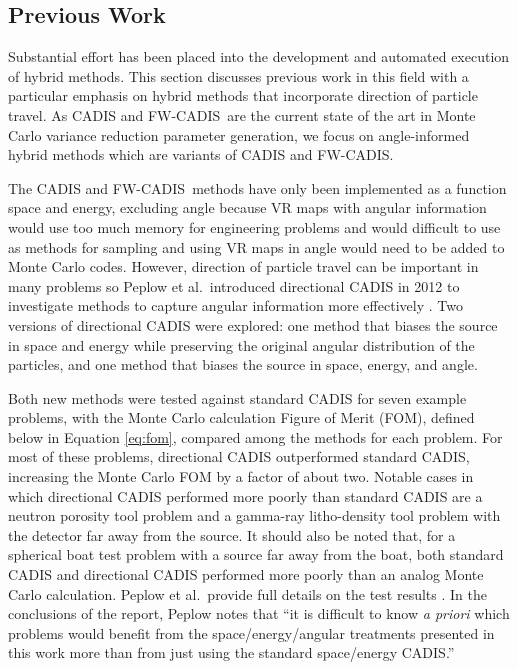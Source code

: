 \documentclass{article} %
\newcommand{\fwc}{\mbox{FW-CADIS}}
\begin{document}
\subsection{Previous Work}

Substantial effort has been placed into the development and automated
execution of hybrid methods. This section discusses previous work in this
field with a particular emphasis on hybrid methods that incorporate
direction of particle travel. As CADIS and \fwc\ are the current state of the
art in Monte Carlo variance reduction parameter generation, we focus on
angle-informed hybrid methods which are variants of CADIS and \fwc.

The CADIS and \fwc\ methods have only been implemented as a
function space and energy, excluding angle because VR maps with angular information would use too much memory for engineering problems and would difficult to use as methods for sampling and using VR maps in angle would need to be added to Monte Carlo codes. However, direction of particle
travel can be important in many problems so Peplow et al.\ introduced directional CADIS in 2012 to investigate methods to capture angular information more effectively
\cite{peplow}. Two versions of directional CADIS were explored: one method
that biases the source in space and energy while preserving the original
angular distribution of the particles, and one method that biases the source
in space, energy, and angle. 

Both new methods were tested against standard
CADIS for seven example problems, with the Monte Carlo calculation Figure of
Merit (FOM), defined below in Equation \eqref{eq:fom}, compared among the
methods for each problem. For most of these problems, directional CADIS
outperformed standard CADIS, increasing the Monte Carlo FOM by a factor of
about two. Notable cases in which directional CADIS performed more poorly than
standard CADIS are a neutron porosity tool problem and a gamma-ray litho-density
 tool problem with the detector far away from the source. It should
also be noted that, for a spherical boat test problem with a source far away
from the boat, both standard CADIS and directional CADIS performed more poorly
than an analog Monte Carlo calculation. Peplow et al.\ provide full details on
the test results \cite{peplow}. In the conclusions of the
report, Peplow notes that ``it is difficult to know \textit{a priori} which
problems would benefit from the space/energy/angular treatments presented in
this work more than from just using the standard space/energy CADIS.''
\end{document}

